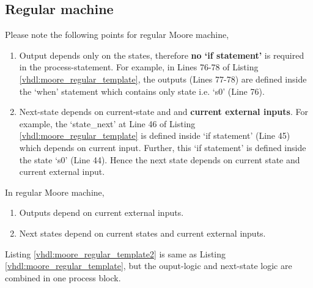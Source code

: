 \subsection{Regular machine}
Please note the following points for regular Moore machine, 
\begin{enumerate}
	\item Output depends only on the states, therefore \textbf{no `if statement'} is required in the process-statement. For example, in Lines 76-78 of Listing \ref{vhdl:moore_regular_template}, the outputs (Lines 77-78) are defined inside the `when' statement which contains only state i.e. `s0' (Line 76). 
	\item Next-state depends on current-state and and  \textbf{current external inputs}. For example, the `state\_next' at Line 46 of Listing \ref{vhdl:moore_regular_template} is defined inside `if statement' (Line 45) which depends on current input. Further, this `if statement' is defined inside the state `s0' (Line 44). Hence the next state depends on current state and current external input.    
\end{enumerate}

\begin{noNumBox}
	In regular Moore machine, 
	\begin{enumerate}
		\item Outputs depend on current external inputs. 
		\item Next states depend on current states and current external inputs.
	\end{enumerate}
\end{noNumBox}



Listing \ref{vhdl:moore_regular_template2} is same as Listing \ref{vhdl:moore_regular_template}, but the ouput-logic and next-state logic are combined in one process block. 



